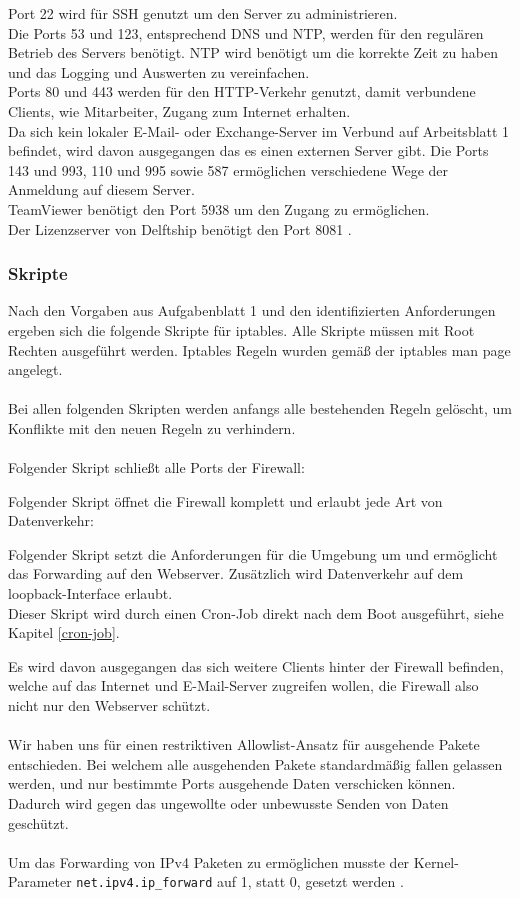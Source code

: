 \documentclass[
    a4paper,
    pagesize,
	pdftex,
    12pt,
]{scrartcl}
\begin{document}
Port 22 wird für SSH genutzt um den Server zu administrieren. \\
Die Ports 53 und 123, entsprechend DNS und NTP, werden für den regulären Betrieb des Servers benötigt. NTP wird benötigt um die korrekte Zeit zu haben und das Logging und Auswerten zu vereinfachen. \\
Ports 80 und 443 werden für den HTTP-Verkehr genutzt, damit verbundene Clients, wie Mitarbeiter, Zugang zum Internet erhalten. \\
Da sich kein lokaler E-Mail- oder Exchange-Server im Verbund auf Arbeitsblatt 1 befindet, wird davon ausgegangen das es einen externen Server gibt. Die Ports 143 und 993, 110 und 995 sowie 587 ermöglichen verschiedene Wege der Anmeldung auf diesem Server. \\
TeamViewer benötigt den Port 5938 um den Zugang zu ermöglichen. \\
Der Lizenzserver von Delftship benötigt den Port 8081 \cite{delftship}.

\subsubsection{Skripte}
Nach den Vorgaben aus Aufgabenblatt 1 und den identifizierten Anforderungen ergeben sich die folgende Skripte für iptables. Alle Skripte müssen mit  Root Rechten ausgeführt werden.  Iptables Regeln wurden gemäß der iptables man page \cite{iptables-manpage} angelegt. \\ \\ 
Bei allen folgenden Skripten werden anfangs alle bestehenden Regeln gelöscht, um Konflikte mit den neuen Regeln zu verhindern. \\ \\
Folgender Skript schließt alle Ports der Firewall:

Folgender Skript öffnet die Firewall komplett und erlaubt jede Art von Datenverkehr:

Folgender  Skript setzt die Anforderungen für die Umgebung um und ermöglicht das Forwarding auf den Webserver. Zusätzlich  wird  Datenverkehr auf dem  loopback-Interface erlaubt. \\
Dieser Skript wird durch einen Cron-Job direkt nach dem Boot ausgeführt, siehe Kapitel \ref{cron-job}.

Es wird davon ausgegangen das sich weitere Clients hinter der Firewall befinden, welche auf das Internet und E-Mail-Server zugreifen wollen, die Firewall also nicht nur den Webserver schützt.
\\ \\
Wir haben uns für einen restriktiven Allowlist-Ansatz \cite{allowlist} für ausgehende Pakete entschieden. Bei welchem alle ausgehenden Pakete standardmäßig fallen gelassen werden, und nur bestimmte Ports ausgehende Daten verschicken können. Dadurch wird gegen das ungewollte oder unbewusste Senden von Daten geschützt.
\\ \\
Um das Forwarding von IPv4 Paketen zu ermöglichen musste der Kernel-Parameter \lstinline[breaklines]|net.ipv4.ip_forward| auf 1, statt 0, gesetzt werden \cite{ipv4forward-kernel}. 
\end{document}

